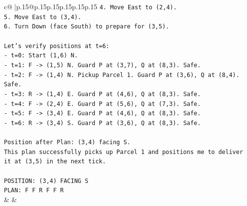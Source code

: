 \documentclass{article}
\begin{document}
{\begin{supertabular}{c@{$\;$}|p{.15\linewidth}@{}p{.15\linewidth}p{.15\linewidth}p{.15\linewidth}p{.15\linewidth}p{.15\linewidth}}
{{{\texttt{4. Move East to (2,4).} \\
\texttt{5. Move East to (3,4).} \\
\texttt{6. Turn Down (face South) to prepare for (3,5).} \\
\\ 
\texttt{Let's verify positions at t=6:} \\
\texttt{{-} t=0: Start (1,6) N.} \\
\texttt{{-} t=1: F {-}> (1,5) N. Guard P at (3,7), Q at (8,3). Safe.} \\
\texttt{{-} t=2: F {-}> (1,4) N. Pickup Parcel 1. Guard P at (3,6), Q at (8,4). Safe.} \\
\texttt{{-} t=3: R {-}> (1,4) E. Guard P at (4,6), Q at (8,3). Safe.} \\
\texttt{{-} t=4: F {-}> (2,4) E. Guard P at (5,6), Q at (7,3). Safe.} \\
\texttt{{-} t=5: F {-}> (3,4) E. Guard P at (4,6), Q at (8,3). Safe.} \\
\texttt{{-} t=6: R {-}> (3,4) S. Guard P at (3,6), Q at (8,3). Safe.} \\
\\ 
\texttt{Position after Plan: (3,4) facing S.} \\
\texttt{This plan successfully picks up Parcel 1 and positions me to deliver it at (3,5) in the next tick.} \\
\\ 
\texttt{POSITION: (3,4) FACING S} \\
\texttt{PLAN: F F R F F R} \\
            }
        }
    }
    & & \\ \\


\end{supertabular}}
\end{document}
